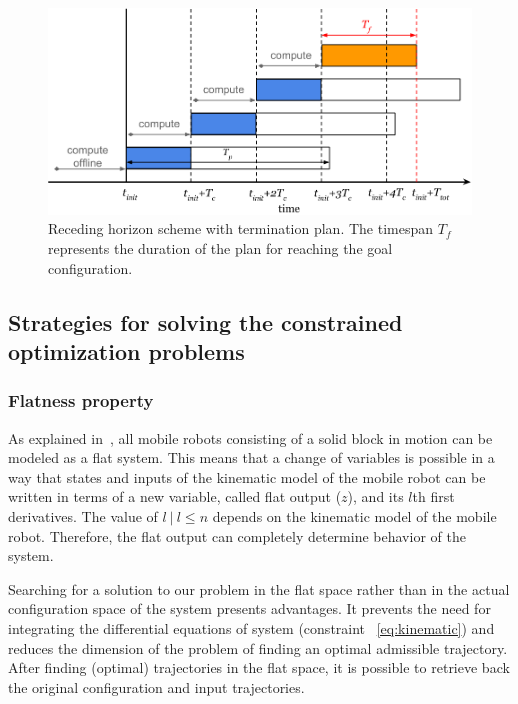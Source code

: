 \begin{figure}[!h]
  \centering
  \includegraphics[width=\linewidth]{./images/receding_horizon/recedinghorizon2.png} %
  \caption{Receding horizon scheme with termination plan. The timespan $T_f$ represents the duration of the plan for reaching the goal configuration.\label{fig:recedinghor}}
\end{figure}



\subsection{Strategies for solving the constrained optimization problems}



\subsubsection{Flatness property}

As explained in~\cite{Defoort2007a}, all mobile robots consisting of a solid
block in motion can be modeled as a flat system. 
This means that a change of variables is possible in a way that states and
inputs of the kinematic model of the mobile robot can be written in terms
of a new variable, called flat output ($z$), and its $l$th first derivatives.
The value of $l\ |\ l \leq n$ depends on the kinematic model of the mobile robot.
Therefore, the flat output can completely determine behavior of the system.


Searching for a solution to our problem in the flat space rather than in
the actual configuration space of the system presents advantages.
It prevents the need for integrating the differential equations
of system (constraint ~\ref{eq:kinematic}) and reduces the dimension of the 
problem of finding an optimal admissible trajectory.
After finding (optimal) trajectories in the flat space, it is possible
to retrieve back the original configuration and input trajectories.

